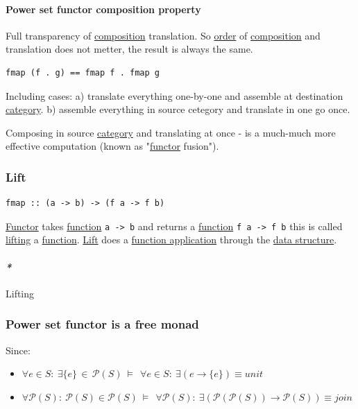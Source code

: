 \documentclass[a4paper,14pt,oneside]{book}
\begin{document}
\paragraph{\label{org2b5964c}Power set functor composition property}
\label{sec:orga4b79d4}
Full transparency of \hyperref[org6a6c663]{composition} translation.
So \hyperref[org91521a8]{order} of \hyperref[org6a6c663]{composition} and translation does not metter, the result is always the same.

\begin{verbatim}
fmap (f . g) == fmap f . fmap g
\end{verbatim}

Including cases:
  a) translate everything one-by-one and assemble at destination \hyperref[orgfd021ba]{category}.
  b) assemble everything in source cetegory and translate in one go once.

Composing in source \hyperref[orgfd021ba]{category} and translating at once - is a much-much more effective computation (known as "\hyperref[org3bd25a7]{functor} \label{orgdcb5cb9}fusion").

\subsubsection{\label{org8b2b23f}Lift}
\label{sec:orgedc8ce7}
\begin{verbatim}
fmap :: (a -> b) -> (f a -> f b)
\end{verbatim}

\hyperref[org3bd25a7]{Functor} takes \hyperref[orgaa71573]{function} \texttt{a -> b} and returns a \hyperref[orgaa71573]{function} \texttt{f a -> f b} this is called \hyperref[org2f49982]{lifting} a \hyperref[orgaa71573]{function}.
\hyperref[org8b2b23f]{Lift} does a \hyperref[org6bae374]{function application} through the \hyperref[org2fd7429]{data structure}.

\paragraph{\emph{*}}
\label{sec:org48907e8}

\label{org2f49982}Lifting

\subsubsection{\label{org8d757cc}Power set functor is a free monad}
\label{sec:org73eb914}
Since:
\begin{itemize}
\item \(\forall e \in S : \ \exists \{e\} \, \in \, {\mathcal{P}(S)} \ \vDash \ \ \forall e \in S : \ \exists (e \to \{e\}) \equiv unit\)
\item \(\forall \mathcal{P}(S) : \ \mathcal{P}(S) \in \mathcal{P}(S) \ \vDash \ \ \forall \mathcal{P}(S) : \ \exists (\mathcal{P}(\mathcal{P}(S)) \to \mathcal{P}(S)) \equiv join\)
\end{itemize}
\end{document}
